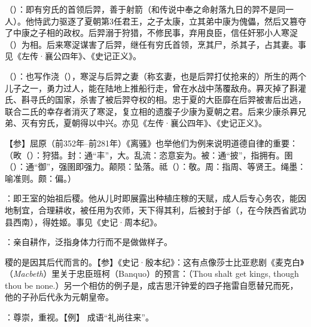 {
\item {}（）：即有穷氏的首领后羿，善于射箭（和传说中奉之命射落九日的羿不是同一人）。他恃武力驱逐了夏朝第3任君王，之子太康，立其弟中康为傀儡，然后又篡夺了中康之子相的政权。后羿溺于狩猎，不修民事，弃用良臣，信任奸邪小人寒浞（）为相。后来寒浞谋害了后羿，继任有穷氏首领，烹其尸，杀其子，占其妻。事见《左传·襄公四年》、《史记正义》。
\item {}（）：也写作浇（），寒浞与后羿之妻（称玄妻，也是后羿打仗抢来的）所生的两个儿子之一，勇力过人，能在陆地上推船行走，曾在水战中荡覆敌舟。奡灭掉了斟灌氏、斟寻氏的国家，杀害了被后羿夺权的相。忠于夏的大臣靡在后羿被害后出逃，联合二氏的幸存者消灭了寒浞，复立相的遗腹子少康为夏朝之君。后来少康杀奡兄弟、灭有穷氏，夏朝得以中兴。亦见《左传·襄公四年》、《史记正义》。

【参】屈原（前352年--前281年）《离骚》也举他们为例来说明道德自律的重要：（畋（）：狩猎。封：通“丰”，大。乱流：恣意妄为。被：通“披”，指拥有。圉（）：通“御”，强圉即强力。颠陨：坠落。祗（）：敬。周：指周、等贤王。绳墨：喻准则。颇：偏。）

\item {}：即王室的始祖后稷。他从儿时即展露出种植庄稼的天赋，成人后专心务农，能因地制宜，合理耕收，被任用为农师，天下得其利，后被封于邰（，在今陕西省武功县西南），得姓姬。事见《史记·周本纪》。
\item {}：亲自耕作，泛指身体力行而不是做做样子。
\item 稷的是因其后代而言的。【参】《史记·殷本纪》：这有点像莎士比亚悲剧《麦克白》（\emph{Macbeth}）里关于忠臣班柯（Banquo）的预言：（Thou shalt get kings, though thou be none.）另一个相仿的例子是，成吉思汗钟爱的四子拖雷自愿替兄而死，他的子孙后代永为元朝皇帝。
\item {}：尊崇，重视。【例】 成语“礼尚往来”。
}
{}



